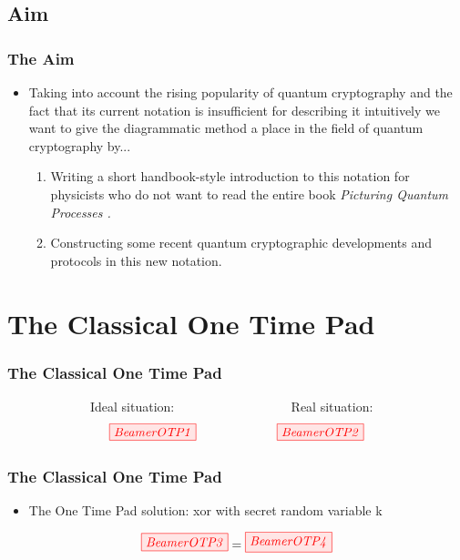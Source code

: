 \documentclass[]{beamer}
\begin{document}
\subsection{Aim}

\begin{frame}
	\frametitle{The Aim}
	\begin{itemize}
		\item Taking into account the rising popularity of quantum cryptography and the fact that its current notation is insufficient for describing it intuitively we want to give the diagrammatic method a place in the field of quantum cryptography by...
		\vspace{0.6cm}
		\begin{enumerate}
			\item Writing a short handbook-style introduction to this notation for physicists who do not want to read the entire book \textit{Picturing Quantum Processes \cite{Coecke2017}.}
			\vspace{0.6cm}
			\item Constructing some recent quantum cryptographic developments and protocols in this new notation.
		\end{enumerate}
	\end{itemize}
\end{frame}

\section{The Classical One Time Pad}
\begin{frame}
	\centering 
	\Huge
\end{frame}
\begin{frame}
	\frametitle{The Classical One Time Pad}
	~~~~~~~~~~~~~Ideal situation:  ~~~~~~~~~~~~~~~~~ Real situation:
	\begin{equation}
	\tikzfig{BeamerOTP1} ~~~~~~~~~~~~~~~~~~~ \tikzfig{BeamerOTP2}
 	\end{equation}
\end{frame}

\begin{frame}
	\frametitle{The Classical One Time Pad}
	\begin{itemize}
	\item The One Time Pad solution: xor with secret random variable k
	\vspace{0.5cm}
	\end{itemize}
\begin{equation}
	\tikzfig{BeamerOTP3} = \tikzfig{BeamerOTP4} %
\end{equation}
\end{frame}
\end{document}
